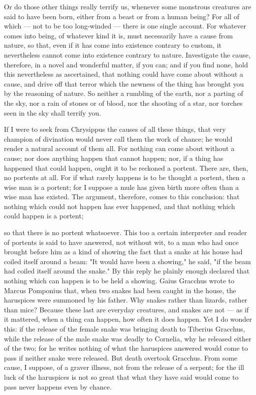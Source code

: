  Or do those other things really terrify us, whenever some monstrous creatures are said to have been born, either from a beast or from a human being? For all of which — not to be too long-winded — there is one single account. For whatever comes into being, of whatever kind it is, must necessarily have a cause from nature, so that, even if it has come into existence contrary to custom, it nevertheless cannot come into existence contrary to nature. Investigate the cause, therefore, in a novel and wonderful matter, if you can; and if you find none, hold this nevertheless as ascertained, that nothing could have come about without a cause, and drive off that terror which the newness of the thing has brought you by the reasoning of nature. So neither a rumbling of the earth, nor a parting of the sky, nor a rain of stones or of blood, nor the shooting of a star, nor torches seen in the sky shall terrify you.

 If I were to seek from Chrysippus the causes of all these things, that very champion of divination would never call them the work of chance; he would render a natural account of them all. For nothing can come about without a cause; nor does anything happen that cannot happen; nor, if a thing has happened that could happen, ought it to be reckoned a portent. There are, then, no portents at all. For if what rarely happens is to be thought a portent, then a wise man is a portent; for I suppose a mule has given birth more often than a wise man has existed. The argument, therefore, comes to this conclusion: that nothing which could not happen has ever happened, and that nothing which could happen is a portent;

 so that there is no portent whatsoever. This too a certain interpreter and reader of portents is said to have answered, not without wit, to a man who had once brought before him as a kind of showing the fact that a snake at his house had coiled itself around a beam: "It would have been a showing," he said, "if the beam had coiled itself around the snake." By this reply he plainly enough declared that nothing which can happen is to be held a showing. Gaius Gracchus wrote to Marcus Pomponius that, when two snakes had been caught in the house, the haruspices were summoned by his father. Why snakes rather than lizards, rather than mice? Because these last are everyday creatures, and snakes are not — as if it mattered, when a thing can happen, how often it does happen. Yet I do wonder this: if the release of the female snake was bringing death to Tiberius Gracchus, while the release of the male snake was deadly to Cornelia, why he released either of the two; for he writes nothing of what the haruspices answered would come to pass if neither snake were released. But death overtook Gracchus. From some cause, I suppose, of a graver illness, not from the release of a serpent; for the ill luck of the haruspices is not so great that what they have said would come to pass never happens even by chance.

